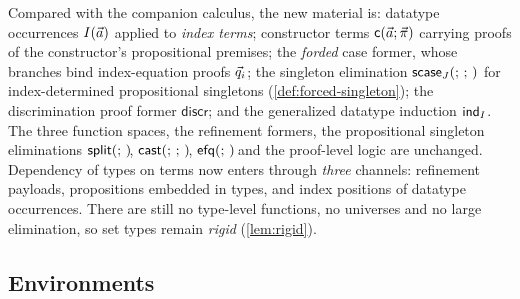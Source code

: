 Compared with the companion calculus, the new material is: datatype
occurrences $I(\vec{a})$ applied to \emph{index terms}; constructor terms
$\mathsf{c}(\vec{a}; \vec{\pi})$ carrying proofs of the constructor's
propositional premises; the \emph{forded} case former, whose branches
bind index-equation proofs $\vec{q}_i$; the singleton elimination
$\mathsf{scase}_{J}(;\,;\,)$ for index-determined propositional singletons
(\cref{def:forced-singleton}); the discrimination proof former
$\mathsf{discr}$; and the generalized datatype induction $\mathsf{ind}_{I}$.  The
three function spaces, the refinement formers, the propositional
singleton eliminations $\mathsf{split}(;\,)\!$, $\mathsf{cast}(;\,;\,)\!$,
$\mathsf{efq}(;\,)\!$ and the proof-level logic are unchanged.  Dependency of
types on terms now enters through \emph{three} channels: refinement
payloads, propositions embedded in types, and index positions of datatype
occurrences.  There are still no type-level functions, no universes and
no large elimination, so set types remain \emph{rigid}
(\cref{lem:rigid}).

\subsection{Environments}
\label{sec:calculus-env}

